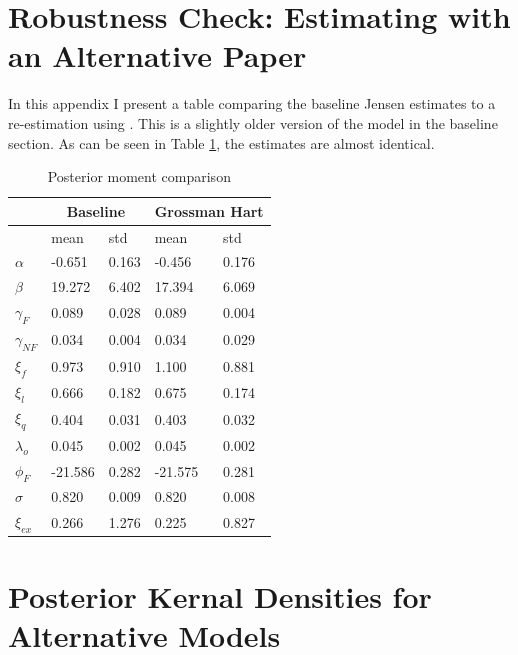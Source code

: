 \clearpage
\section{Robustness Check: Estimating with an Alternative Paper}
\label{sec:gross}

In this appendix I present a table comparing the baseline Jensen estimates to a re-estimation using
\citet{grossman1986costs}.  This is a slightly older version of the model in the baseline section.  As can be seen in Table \ref{tab:post_comp}, the estimates are almost 
identical.

\begin{table}[!ht]
    \centering
    \begin{tabular}{lllll}
        \hline
         & \multicolumn{2}{c}{Baseline}        & \multicolumn{2}{c}{Grossman Hart} \\ \hline\hline
                            & mean    & std   & mean       & std    \\ 
         $\alpha$           & -0.651  & 0.163 & -0.456     & 0.176  \\ 
         $\beta$            & 19.272  & 6.402 & 17.394     & 6.069  \\ 
         $\gamma_{F}$       & 0.089   & 0.028 & 0.089      & 0.004  \\ 
         $\gamma_{NF}$      & 0.034   & 0.004 & 0.034      & 0.029  \\ 
         $\xi_f$            & 0.973   & 0.910 & 1.100      & 0.881  \\ 
         $\xi_l$            & 0.666   & 0.182 & 0.675      & 0.174  \\ 
         $\xi_q$            & 0.404   & 0.031 & 0.403      & 0.032  \\ 
         $\lambda_o$        & 0.045   & 0.002 & 0.045      & 0.002  \\ 
         $\phi_F$           & -21.586 & 0.282 & -21.575    & 0.281  \\ 
         $\sigma$           & 0.820   & 0.009 & 0.820      & 0.008  \\ 
         $\xi_{ex}$         & 0.266   & 1.276 & 0.225      & 0.827  \\ \hline
    \end{tabular}
    \caption{Posterior moment comparison}
    \label{tab:post_comp}
\end{table}

\clearpage
\section{Posterior Kernal Densities for Alternative Models}
\label{sec:altmodels}

